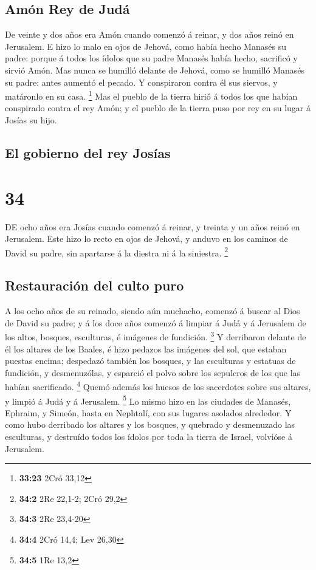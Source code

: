 \hypertarget{amuxf3n-rey-de-juduxe1}{%
\subsection{Amón Rey de Judá}\label{amuxf3n-rey-de-juduxe1}}

 De veinte y dos años era Amón cuando comenzó á reinar, y
dos años reinó en Jerusalem.  E hizo lo malo en ojos de
Jehová, como había hecho Manasés su padre: porque á todos los ídolos que
su padre Manasés había hecho, sacrificó y sirvió Amón. 
Mas nunca se humilló delante de Jehová, como se humilló Manasés su
padre: antes aumentó el pecado.  Y conspiraron contra él
sus siervos, y matáronlo en su casa. \footnote{\textbf{33:23} 2Cró 33,12}
 Mas el pueblo de la tierra hirió á todos los que habían
conspirado contra el rey Amón; y el pueblo de la tierra puso por rey en
su lugar á Josías su hijo. 

\hypertarget{el-gobierno-del-rey-josuxedas}{%
\subsection{El gobierno del rey
Josías}\label{el-gobierno-del-rey-josuxedas}}

\hypertarget{section-33}{%
\section{34}\label{section-33}}

 DE ocho años era Josías cuando comenzó á reinar, y
treinta y un años reinó en Jerusalem.  Este hizo lo recto
en ojos de Jehová, y anduvo en los caminos de David su padre, sin
apartarse á la diestra ni á la siniestra. \footnote{\textbf{34:2} 2Re
  22,1-2; 2Cró 29,2}

\hypertarget{restauraciuxf3n-del-culto-puro}{%
\subsection{Restauración del culto
puro}\label{restauraciuxf3n-del-culto-puro}}

 A los ocho años de su reinado, siendo aún muchacho,
comenzó á buscar al Dios de David su padre; y á los doce años comenzó á
limpiar á Judá y á Jerusalem de los altos, bosques, esculturas, é
imágenes de fundición. \footnote{\textbf{34:3} 2Re 23,4-20}
 Y derribaron delante de él los altares de los Baales, é
hizo pedazos las imágenes del sol, que estaban puestas encima; despedazó
también los bosques, y las esculturas y estatuas de fundición, y
desmenuzólas, y esparció el polvo sobre los sepulcros de los que las
habían sacrificado. \footnote{\textbf{34:4} 2Cró 14,4; Lev 26,30}
 Quemó además los huesos de los sacerdotes sobre sus
altares, y limpió á Judá y á Jerusalem. \footnote{\textbf{34:5} 1Re 13,2}
 Lo mismo hizo en las ciudades de Manasés, Ephraim, y
Simeón, hasta en Nephtalí, con sus lugares asolados alrededor.
 Y como hubo derribado los altares y los bosques, y
quebrado y desmenuzado las esculturas, y destruído todos los ídolos por
toda la tierra de Israel, volvióse á Jerusalem.

